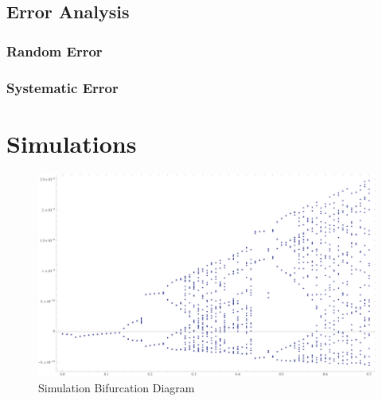 \documentclass[12pt]{report}
\begin{document}



\section{Error Analysis} %
\label{sec:Error Analysis}

\subsection{Random Error}
\label{subsec:RandomError}


\subsection{Systematic Error}
\label{subsec: Systematic Error}



\chapter{Simulations} %
\label{ch:Simulations}



	\begin{figure}[h]
		\centering
		\includegraphics{simulations/circuit.png}
		\caption{Simulation Bifurcation Diagram}
		\label{fig: Simulation Bifurcation Diagram}
	\end{figure}


\end{document}
